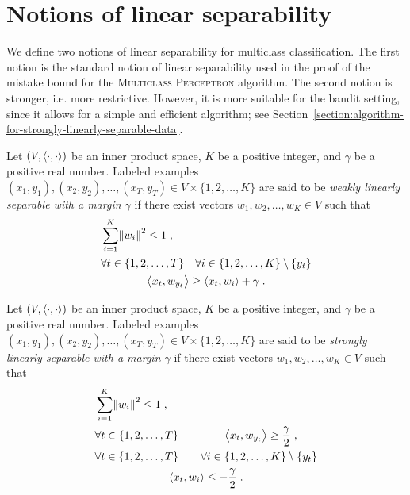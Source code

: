 \section{Notions of linear separability}
\label{section:notions-of-linear-separability}

We define two notions of linear separability for multiclass classification. The
first notion is the standard notion of linear separability used in the proof of
the mistake bound for the \textsc{Multiclass Perceptron} algorithm. The second
notion is stronger, i.e. more restrictive. However, it is more suitable for the
bandit setting, since it allows for a simple and efficient algorithm; see
Section~\ref{section:algorithm-for-strongly-linearly-separable-data}.

\begin{definition}
\label{definition:weak-linear-separability}
Let $(V,\left\langle \cdot, \cdot \right\rangle)$ be an inner product space, $K$ be a positive
integer, and $\gamma$ be a positive real number. Labeled examples $(x_1, y_1),
(x_2, y_2), \dots, (x_T, y_T) \in V \times \{1,2,\dots,K\}$ are said to be
\emph{weakly linearly separable with a margin $\gamma$} if there exist vectors
$w_1, w_2, \dots, w_K \in V$ such that
\begin{align}
\label{equation:weak-linear-separability-1}
& \sum_{i=1}^K \norm{w_i}^2 \le 1 \; , \\
\label{equation:weak-linear-separability-2}
& \begin{gathered}
\forall t \in \{1,2,\dots,T\} \quad \forall i \in \{1,2,\dots, K\} \setminus \{y_t\} \\
\left\langle x_t, w_{y_t} \right\rangle \ge \left\langle x_t, w_i \right\rangle + \gamma \; .
\end{gathered}
\end{align}
\end{definition}

\begin{definition}
\label{definition:strong-linear-separability}
Let $(V,\left\langle \cdot, \cdot \right\rangle)$ be an inner product space, $K$ be a positive
integer, and $\gamma$ be a positive real number. Labeled examples $(x_1, y_1),
(x_2, y_2), \dots, (x_T, y_T) \in V \times \{1,2,\dots,K\}$ are said to be
\emph{strongly linearly separable with a margin $\gamma$} if there exist vectors
$w_1, w_2, \dots, w_K \in V$ such that
\begin{align}
\label{equation:strong-linear-separability-1}
& \sum_{i=1}^K \norm{w_i}^2 \le 1 \; , \\
\label{equation:strong-linear-separability-2}
& \forall t \in \{1,2,\dots,T\} \qquad \qquad \left\langle x_t, w_{y_t} \right\rangle \ge \frac \gamma 2 \; , \\
\label{equation:strong-linear-separability-3}
& \begin{gathered}
\forall t \in \{1,2,\dots,T\} \qquad \forall i \in \{1,2,\dots, K\} \setminus \{y_t\} \\
\left\langle x_t, w_i \right\rangle \le - \frac \gamma 2 \; .
\end{gathered}
\end{align}
\end{definition}

